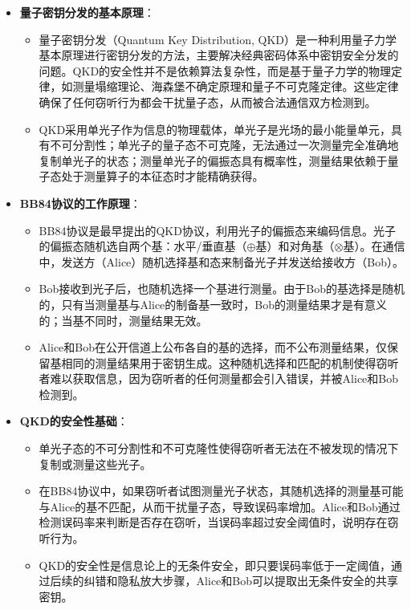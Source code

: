 \documentclass[dvipsnames, svgnames,a4paper,11pt]{article}
\begin{document}
	\begin{itemize}
		\item \textbf{量子密钥分发的基本原理}：
		\begin{itemize}
			\item 量子密钥分发（Quantum Key Distribution, QKD）是一种利用量子力学基本原理进行密钥分发的方法，主要解决经典密码体系中密钥安全分发的问题。QKD的安全性并不是依赖算法复杂性，而是基于量子力学的物理定律，如测量塌缩理论、海森堡不确定原理和量子不可克隆定律。这些定律确保了任何窃听行为都会干扰量子态，从而被合法通信双方检测到。
			\item QKD采用单光子作为信息的物理载体，单光子是光场的最小能量单元，具有不可分割性；单光子的量子态不可克隆，无法通过一次测量完全准确地复制单光子的状态；测量单光子的偏振态具有概率性，测量结果依赖于量子态处于测量算子的本征态时才能精确获得。
		\end{itemize}
		
		\item \textbf{BB84协议的工作原理}：
		\begin{itemize}
			\item BB84协议是最早提出的QKD协议，利用光子的偏振态来编码信息。光子的偏振态随机选自两个基：水平/垂直基（$\oplus$基）和对角基（$\otimes$基）。在通信中，发送方（Alice）随机选择基和态来制备光子并发送给接收方（Bob）。
			\item Bob接收到光子后，也随机选择一个基进行测量。由于Bob的基选择是随机的，只有当测量基与Alice的制备基一致时，Bob的测量结果才是有意义的；当基不同时，测量结果无效。
			\item Alice和Bob在公开信道上公布各自的基的选择，而不公布测量结果，仅保留基相同的测量结果用于密钥生成。这种随机选择和匹配的机制使得窃听者难以获取信息，因为窃听者的任何测量都会引入错误，并被Alice和Bob检测到。
		\end{itemize}

		\item \textbf{QKD的安全性基础}：
		\begin{itemize}
			\item 单光子态的不可分割性和不可克隆性使得窃听者无法在不被发现的情况下复制或测量这些光子。
			\item 在BB84协议中，如果窃听者试图测量光子状态，其随机选择的测量基可能与Alice的基不匹配，从而干扰量子态，导致误码率增加。Alice和Bob通过检测误码率来判断是否存在窃听，当误码率超过安全阈值时，说明存在窃听行为。
			\item QKD的安全性是信息论上的无条件安全，即只要误码率低于一定阈值，通过后续的纠错和隐私放大步骤，Alice和Bob可以提取出无条件安全的共享密钥。
		\end{itemize}
	\end{itemize}
	
\end{document}
